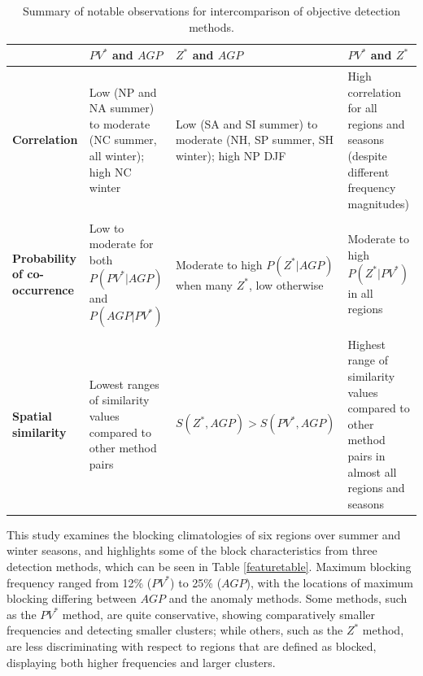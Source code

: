 \documentclass[smallextended]{svjour3}       %
\numberwithin{equation}{section}
\begin{document}
\begin{table}
\caption{Summary of notable observations for intercomparison of objective detection methods.} \label{inttable}
\begin{tabular}[t]{|L{0.18\textwidth}|L{0.27\textwidth}|L{0.27\textwidth}|L{0.27\textwidth}|}\hline
 &$PV^*$ and $AGP$& $Z^*$ and $AGP$ & $PV^*$ and $Z^*$\\
\hline
\textbf{Correlation }
& Low (NP and NA summer) to moderate (NC summer, all winter); high NC winter
& Low (SA and SI summer)  to moderate (NH, SP summer, SH winter); high NP DJF
& High correlation for all regions and seasons (despite different frequency magnitudes)\\
&&&\\
\textbf{Probability of co-occurrence}
& Low to moderate for both $P(PV^*|AGP)$ and $P(AGP|PV^*)$
& Moderate to high $P(Z^*|AGP)$ when many $Z^*$, low otherwise
& Moderate to high $P(Z^*|PV^*)$ in all regions\\
&&&\\
\textbf{Spatial similarity}
& Lowest ranges of similarity values compared to other method pairs
& $S(Z^*,AGP)>S(PV^*,AGP)$
&Highest range of similarity values compared to other method pairs in almost all regions and seasons\\

\hline
\end{tabular}
\end{table}

This study examines the blocking climatologies of six regions over summer and winter seasons, and highlights some of the block characteristics from three detection methods, which can be seen in Table \ref{featuretable}. Maximum blocking frequency ranged from 12\% ($PV^*$) to 25\% ($AGP$), with the locations of maximum blocking differing between $AGP$ and the anomaly methods. Some methods, such as the $PV^*$ method, are quite conservative, showing comparatively smaller frequencies and detecting smaller clusters; while others, such as the $Z^*$ method, are less discriminating with respect to regions that are defined as blocked, displaying both higher frequencies and larger clusters. 
\end{document}

